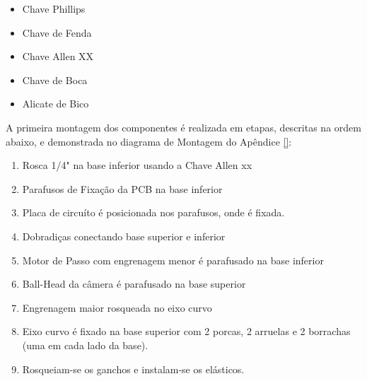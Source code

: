 \begin{itemize}
	\item Chave Phillips
	\item Chave de Fenda
	\item Chave Allen XX
	\item Chave de Boca
	\item Alicate de Bico
\end{itemize}

A primeira montagem dos componentes é realizada em etapas, descritas na ordem abaixo, e demonstrada no diagrama de Montagem do Apêndice \ref{}:

\begin{enumerate}
	\item Rosca 1/4" na base inferior usando a Chave Allen xx
	\item Parafusos de Fixação da PCB na base inferior
	\item Placa de circuíto é posicionada nos parafusos, onde é fixada.
	\item Dobradiças conectando base superior e inferior
	\item Motor de Passo com engrenagem menor é parafusado na base inferior
	\item Ball-Head da câmera é parafusado na base superior
	\item Engrenagem maior rosqueada no eixo curvo
	\item Eixo curvo é fixado na base superior com 2 porcas, 2 arruelas e 2 borrachas (uma em cada lado da base).
	\item Rosqueiam-se os ganchos e instalam-se os elásticos.
\end{enumerate}




